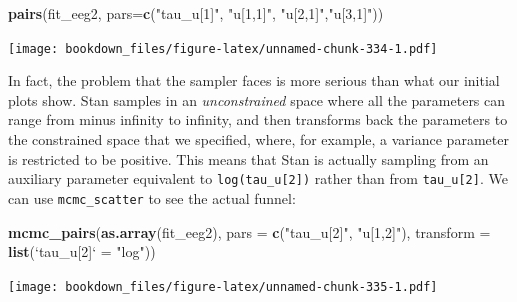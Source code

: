 \documentclass[12pt,]{krantz}
\newenvironment{Shaded}{\begin{snugshade}}{\end{snugshade}}
\newcommand{\KeywordTok}[1]{\textcolor[rgb]{0.13,0.29,0.53}{\textbf{#1}}}
\newcommand{\DataTypeTok}[1]{\textcolor[rgb]{0.13,0.29,0.53}{#1}}
\newcommand{\StringTok}[1]{\textcolor[rgb]{0.31,0.60,0.02}{#1}}
\newcommand{\NormalTok}[1]{#1}
\theoremstyle{definition}
\theoremstyle{definition}
\theoremstyle{definition}
\theoremstyle{remark}
\begin{document}
\begin{Shaded}
\begin{Highlighting}[]
\KeywordTok{pairs}\NormalTok{(fit_eeg2, }\DataTypeTok{pars=}\KeywordTok{c}\NormalTok{(}\StringTok{"tau_u[1]"}\NormalTok{, }\StringTok{"u[1,1]"}\NormalTok{, }\StringTok{"u[2,1]"}\NormalTok{,}\StringTok{"u[3,1]"}\NormalTok{))}
\end{Highlighting}
\end{Shaded}

\texttt{[image: bookdown\_files/figure-latex/unnamed-chunk-334-1.pdf]}

In fact, the problem that the sampler faces is more serious than what
our initial plots show. Stan samples in an \emph{unconstrained} space
where all the parameters can range from minus infinity to infinity, and
then transforms back the parameters to the constrained space that we
specified, where, for example, a variance parameter is restricted to be
positive. This means that Stan is actually sampling from an auxiliary
parameter equivalent to \texttt{log(tau\_u{[}2{]})} rather than from
\texttt{tau\_u{[}2{]}}. We can use \texttt{mcmc\_scatter} to see the
actual funnel:

\begin{Shaded}
\begin{Highlighting}[]
\KeywordTok{mcmc_pairs}\NormalTok{(}\KeywordTok{as.array}\NormalTok{(fit_eeg2), }\DataTypeTok{pars =} \KeywordTok{c}\NormalTok{(}\StringTok{"tau_u[2]"}\NormalTok{, }\StringTok{"u[1,2]"}\NormalTok{),}
           \DataTypeTok{transform =} \KeywordTok{list}\NormalTok{(}\StringTok{`}\DataTypeTok{tau_u[2]}\StringTok{`}\NormalTok{ =}\StringTok{ "log"}\NormalTok{))}
\end{Highlighting}
\end{Shaded}

\texttt{[image: bookdown\_files/figure-latex/unnamed-chunk-335-1.pdf]}
\end{document}
